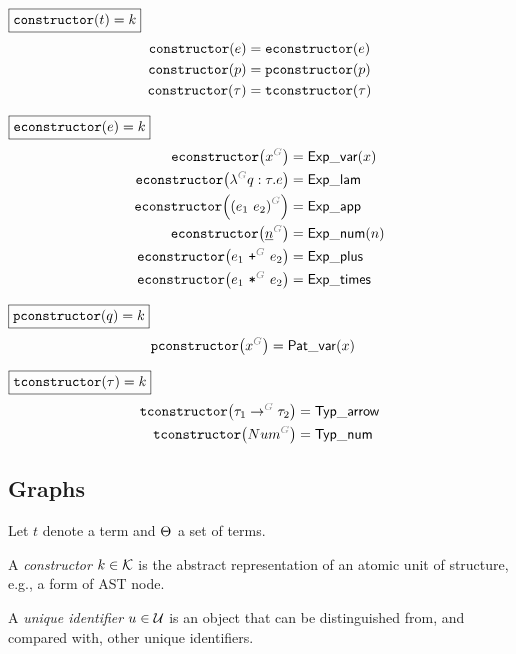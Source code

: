 \noindent $\boxed{\operatorname{\texttt{constructor}}\mathopen{}\left(t\right)\mathclose{} = k}$
%
\begin{align*}
  \operatorname{\texttt{constructor}}\mathopen{}\left(e\right)\mathclose{} &= \operatorname{\texttt{econstructor}}\mathopen{}\left(e\right)\mathclose{} \\
  \operatorname{\texttt{constructor}}\mathopen{}\left(p\right)\mathclose{} &= \operatorname{\texttt{pconstructor}}\mathopen{}\left(p\right)\mathclose{} \\
  \operatorname{\texttt{constructor}}\mathopen{}\left(\tau\right)\mathclose{} &= \operatorname{\texttt{tconstructor}}\mathopen{}\left(\tau\right)\mathclose{}
\end{align*}

\noindent $\boxed{\operatorname{\texttt{econstructor}}\mathopen{}\left(e\right)\mathclose{} = k}$
%
\begin{align*}
  \econstructor{\eVar{G}{x}} &= \ExpVar(x) \\
  \econstructor{\eFun{G}{q}{\tau}{e}} &= \ExpLam \\
  \econstructor{\eApp{G}{e_1}{e_2}} &= \ExpApp \\
  \econstructor{\eNum{G}{n}} &= \ExpNum(n) \\
  \econstructor{\ePlus{G}{e_1}{e_2}} &= \ExpPlus \\
  \econstructor{\eTimes{G}{e_1}{e_2}} &= \ExpTimes
\end{align*}

\noindent $\boxed{\operatorname{\texttt{pconstructor}}\mathopen{}\left(q\right)\mathclose{} = k}$
%
\begin{align*}
  \pconstructor{\pVar{G}{x}} &= \PatVar(x)
\end{align*}

\noindent $\boxed{\operatorname{\texttt{tconstructor}}\mathopen{}\left(\tau\right)\mathclose{} = k}$
%
\begin{align*}
  \tconstructor{\tArrow{G}{\tau_1}{\tau_2}} &= \TypArrow \\
  \tconstructor{\tNum{G}} &= \TypNum
\end{align*}


\subsection{Graphs}

Let $t$ denote a term and $\Theta_{}$ a set of terms.

\begin{definition}
  A \emph{constructor} $k \in \mathcal{K}$ is the abstract representation of an atomic unit of structure, e.g., a form of AST node.
\end{definition}

\begin{definition}
  A \emph{unique identifier} $u \in \mathcal{U}$ is an object that can be distinguished from, and compared with, other unique identifiers.
\end{definition}


